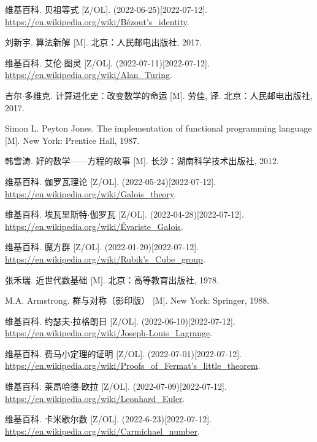 \documentclass[UTF8]{article}
\begin{document}
\begin{thebibliography}{99}
维基百科. 贝祖等式 [Z/OL]. (2022-06-25)[2022-07-12]. \url{https://en.wikipedia.org/wiki/Bézout's_identity}.

刘新宇. 算法新解 [M]. 北京：人民邮电出版社, 2017. %

维基百科. 艾伦$\cdot$图灵 [Z/OL]. (2022-07-11)[2022-07-12]. \url{https://en.wikipedia.org/wiki/Alan_Turing}.

吉尔$\cdot$多维克. 计算进化史：改变数学的命运 [M]. 劳佳, 译. 北京：人民邮电出版社, 2017. %

Simon L. Peyton Jones. The implementation of functional programming language [M]. New York: Prentice Hall, 1987. %


韩雪涛. 好的数学——方程的故事 [M]. 长沙：湖南科学技术出版社, 2012. %

维基百科. 伽罗瓦理论 [Z/OL]. (2022-05-24)[2022-07-12]. \url{https://en.wikipedia.org/wiki/Galois_theory}.

维基百科. 埃瓦里斯特$\cdot$伽罗瓦 [Z/OL]. (2022-04-28)[2022-07-12]. \url{https://en.wikipedia.org/wiki/Évariste_Galois}.

维基百科. 魔方群 [Z/OL]. (2022-01-20)[2022-07-12]. \url{https://en.wikipedia.org/wiki/Rubik's_Cube_group}.

张禾瑞. 近世代数基础 [M]. 北京：高等教育出版社, 1978. %

M.A. Armstrong. 群与对称（影印版） [M]. New York: Springer, 1988. %

维基百科. 约瑟夫$\cdot$拉格朗日 [Z/OL]. (2022-06-10)[2022-07-12]. \url{https://en.wikipedia.org/wiki/Joseph-Louis_Lagrange}.

维基百科. 费马小定理的证明 [Z/OL]. (2022-07-01)[2022-07-12]. \url{https://en.wikipedia.org/wiki/Proofs_of_Fermat's_little_theorem}.

维基百科. 莱昂哈德$\cdot$欧拉 [Z/OL]. (2022-07-09)[2022-07-12]. \url{https://en.wikipedia.org/wiki/Leonhard_Euler}.

维基百科. 卡米歇尔数 [Z/OL]. (2022-6-23)[2022-07-12]. \url{https://en.wikipedia.org/wiki/Carmichael_number}.


\end{thebibliography}
\end{document}
